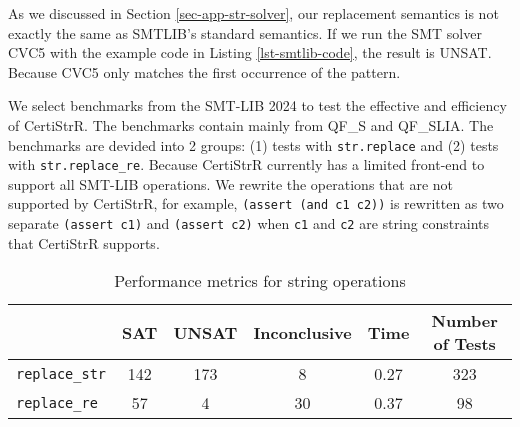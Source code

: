 \documentclass[a4paper,UKenglish,cleveref, autoref, anonymous, thm-restate]{lipics-v2021}
\begin{document}
  As we discussed in Section \ref{sec-app-str-solver}, our replacement semantics is not exactly the same as SMTLIB's standard semantics.
If we run the SMT solver CVC5 \cite{cvc5} with the example code in Listing \ref{lst-smtlib-code}, the result is UNSAT. Because CVC5 only matches the first occurrence of the pattern.


We select benchmarks from the SMT-LIB 2024 \cite{smtlib_benchmarks} to test the effective and efficiency of CertiStrR. The benchmarks contain mainly from QF\_S and QF\_SLIA. The benchmarks are devided into 2 groups: (1) tests with \texttt{str.replace} and (2) tests with \texttt{str.replace\_re}. Because CertiStrR currently has a limited front-end to support all SMT-LIB operations. We rewrite the operations that are not supported by CertiStrR, for example, \texttt{(assert (and c1 c2))} is rewritten as two separate \texttt{(assert c1)} and \texttt{(assert c2)} when \texttt{c1} and \texttt{c2} are string constraints that CertiStrR supports. 




\begin{table}[h]
  \centering
  \begin{tabular}{lccccc}
      \toprule
      & \textbf{SAT} & \textbf{UNSAT} & \textbf{Inconclusive} & \textbf{Time} & \textbf{Number of Tests} \\
      \midrule
      \texttt{replace\_str} & 142 & 173 & 8 & 0.27 & 323\\
      \texttt{replace\_re} & 57 & 4 & 30 & 0.37 & 98\\
      \bottomrule
  \end{tabular}
  \caption{Performance metrics for string operations}
  \label{tab:string_operations}
\end{table}
\end{document}

